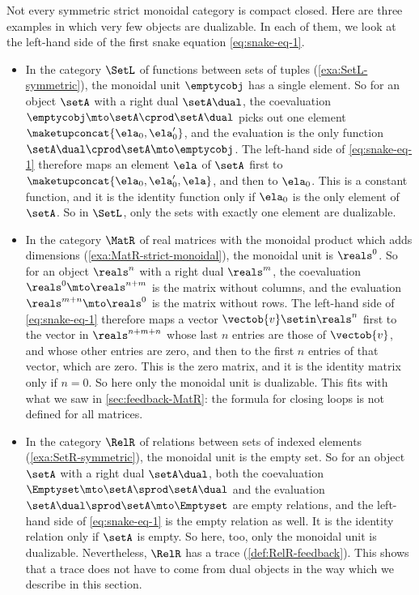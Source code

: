 \begin{example}
    \label{exa:not-compact-closed}
    Not every symmetric strict monoidal category is compact closed.
    Here are three examples in which very few objects are dualizable.
    In each of them, we look at the left-hand side of the first snake equation \cref{eq:snake-eq-1}.
    \begin{itemize}
        \item In the category $\SetL$ of functions between sets of tuples (\cref{exa:SetL-symmetric}), the monoidal unit $\emptycobj$ has a single element.
              So for an object $\setA$ with a right dual $\setA\dual$, the coevaluation $\emptycobj \mto \setA \cprod \setA\dual$ picks out one element $\maketupconcat{\ela_0, \ela_0'}$, and the evaluation is the only function $\setA\dual \cprod \setA \mto \emptycobj$.
              The left-hand side of \cref{eq:snake-eq-1} therefore maps an element $\ela$ of $\setA$ first to $\maketupconcat{\ela_0, \ela_0', \ela}$, and then to $\ela_0$.
              This is a constant function, and it is the identity function only if $\ela_0$ is the only element of $\setA$.
              So in $\SetL$, only the sets with exactly one element are dualizable.
        \item In the category $\MatR$ of real matrices with the monoidal product which adds dimensions (\cref{exa:MatR-strict-monoidal}), the monoidal unit is $\reals^0$.
              So for an object $\reals^n$ with a right dual $\reals^m$, the coevaluation $\reals^0 \mto \reals^{n+m}$ is the matrix without columns, and the evaluation $\reals^{m+n} \mto \reals^0$ is the matrix without rows.
              The left-hand side of \cref{eq:snake-eq-1} therefore maps a vector $\vectob{v} \setin \reals^n$ first to the vector in $\reals^{n+m+n}$ whose last $n$ entries are those of $\vectob{v}$, and whose other entries are zero, and then to the first $n$ entries of that vector, which are zero.
              This is the zero matrix, and it is the identity matrix only if $n = 0$.
              So here only the monoidal unit is dualizable.
              This fits with what we saw in \cref{sec:feedback-MatR}: the formula for closing loops is not defined for all matrices.
        \item In the category $\RelR$ of relations between sets of indexed elements (\cref{exa:SetR-symmetric}), the monoidal unit is the empty set.
              So for an object $\setA$ with a right dual $\setA\dual$, both the coevaluation $\Emptyset \mto \setA \sprod \setA\dual$ and the evaluation $\setA\dual \sprod \setA \mto \Emptyset$ are empty relations, and the left-hand side of \cref{eq:snake-eq-1} is the empty relation as well.
              It is the identity relation only if $\setA$ is empty.
              So here, too, only the monoidal unit is dualizable.
              Nevertheless, $\RelR$ has a trace (\cref{def:RelR-feedback}).
              This shows that a trace does not have to come from dual objects in the way which we describe in this section.
    \end{itemize}
\end{example}


